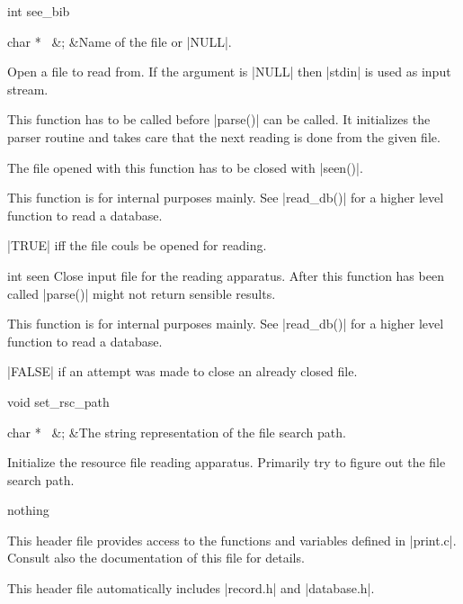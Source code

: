 \begin{Function}{int }{see\_bib}
  \begin{Arguments}
    char * \ 	&;	&Name of the file or |NULL|.
  \end{Arguments}%
  Open a \BibTeX{} file to read from. 
  If the argument is |NULL| then |stdin| is used as
  input stream.
  
  This function has to be called before |parse()| can be
  called. It initializes the parser routine and takes
  care that the next reading is done from the given
  file.
  
  The file opened with this function has to be closed
  with |seen()|.
  
  This function is for internal purposes mainly. See
  |read_db()| for a higher level function to read a
  database. 
  \begin{Result}
    |TRUE| iff the file couls be opened for reading.
  \end{Result}
\end{Function}
\begin{Function}{int }{seen}  Close input file for the \BibTeX{} reading apparatus.
  After this function has been called |parse()| might
  not return sensible results.
  
  This function is for internal purposes mainly. See
  |read_db()| for a higher level function to read a
  database. 
  \begin{Result}
    |FALSE| if an attempt was made to close an already
    closed file.
  \end{Result}
\end{Function}
\begin{Function}{void }{set\_rsc\_path}
  \begin{Arguments}
    char * \ 	&;	&The string representation of the file search path.
  \end{Arguments}%
  Initialize the resource file reading apparatus.
  Primarily try to figure out the file search path.
  \begin{Result}
    nothing
  \end{Result}
\end{Function}


This header file provides access to the functions and
variables defined in |print.c|. Consult also the documentation
of this file for details.

This header file automatically includes |record.h| and |database.h|.



